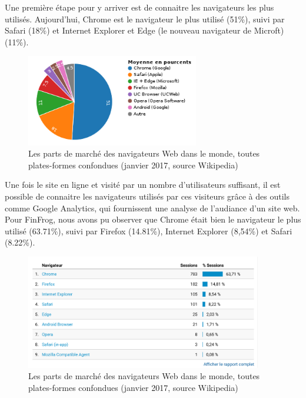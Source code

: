 \documentclass[12pt,a4paper]{article}
\begin{document}
  \bigskip

  Une première étape pour y arriver est de connaitre les navigateurs les
  plus utilisés. Aujourd'hui, Chrome est le navigateur le plus utilisé
  (51\%), suivi par Safari (18\%) et Internet Explorer et Edge (le nouveau
  navigateur de Microft) (11\%).

  \begin{figure}[h]
    \centering
    \includegraphics[height=4cm]{figures/browsers.png}
    \caption{Les parts de marché des navigateurs Web dans le monde, toutes plates-formes confondues (janvier 2017, source Wikipedia)}
  \end{figure}

  \bigskip

  Une fois le site en ligne et visité par un nombre d'utilisateurs
  suffisant, il est possible de connaitre les navigateurs utilisés par ces
  visiteurs grâce à des outils comme Google Analytics, qui fournissent une
  analyse de l'audiance d'un site web. Pour FinFrog, nous avons pu
  observer que Chrome était bien le navigateur le plus utilisé (63.71\%),
  suivi par Firefox (14.81\%), Internet Explorer (8,54\%) et Safari
  (8.22\%).

  \begin{figure}[h]
    \centering
    \includegraphics[height=5cm]{figures/FF-browsers.png}
    \caption{Les parts de marché des navigateurs Web dans le monde, toutes plates-formes confondues (janvier 2017, source Wikipedia)}
  \end{figure}

  \bigskip
\end{document}
